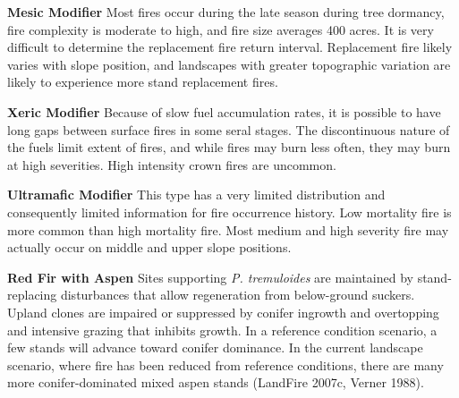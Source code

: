 \begin{adjustwidth}{2cm}{}
\medskip
\noindent \textbf{Mesic Modifier } Most fires occur during the late season during tree dormancy, fire complexity is moderate to high, and fire size averages 400 acres. It is very difficult to determine the replacement fire return interval. Replacement fire likely varies with slope position, and landscapes with greater topographic variation are likely to experience more stand replacement fires.

\medskip
\noindent \textbf{Xeric Modifier} Because of slow fuel accumulation rates, it is possible to have long gaps between surface fires in some seral stages. The discontinuous nature of the fuels limit extent of fires, and while fires may burn less often, they may burn at high severities. High intensity crown fires are uncommon.

\medskip
\noindent \textbf{Ultramafic Modifier} This type has a very limited distribution and consequently limited information for fire occurrence history. Low mortality fire is more common than high mortality fire. Most medium and high severity fire may actually occur on middle and upper slope positions.

\end{adjustwidth}

\noindent \textbf{Red Fir with Aspen} Sites supporting \emph{P. tremuloides} are maintained by stand-replacing disturbances that allow regeneration from below-ground suckers. Upland clones are impaired or suppressed by conifer ingrowth and overtopping and intensive grazing that inhibits growth. In a reference condition scenario, a few stands will advance toward conifer dominance. In the current landscape scenario, where fire has been reduced from reference conditions, there are many more conifer-dominated mixed aspen stands (LandFire 2007c, Verner 1988).


